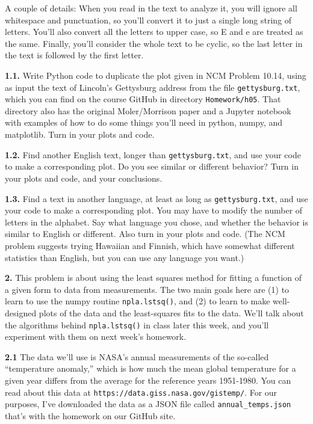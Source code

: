 \documentclass[11pt]{article}
\begin{document}
A couple of details:
When you read in the text to analyze it, you will ignore all whitespace and punctuation,
so you'll convert it to just a single long string of letters.
You'll also convert all the letters to upper case, so E and e are treated as the same.
Finally, you'll consider the whole text to be cyclic, so the last letter in the text is
followed by the first letter.

\par\medskip
{\bf 1.1.}
Write Python code to duplicate the plot given in NCM Problem 10.14, 
using as input the text of Lincoln's Gettysburg address from the file 
{\tt gettysburg.txt}, which you can find on the course GitHub
in directory {\tt Homework/h05}.
That directory also has the original Moler/Morrison paper and
a Jupyter notebook with examples of how to do some things you'll need in 
python, numpy, and matplotlib.
Turn in your plots and code.

\par\medskip
{\bf 1.2.}
Find another English text, longer than {\tt gettysburg.txt},
and use your code to make a corresponding plot.
Do you see similar or different behavior?
Turn in your plots and code, and your conclusions.

\par\medskip
{\bf 1.3.}
Find a text in another language, at least as long as {\tt gettysburg.txt},
and use your code to make a corresponding plot.
You may have to modify the number of letters in the alphabet.
Say what language you chose, and whether the behavior is similar to English or different.
Also turn in your plots and code.
(The NCM problem suggests trying Hawaiian and Finnish, 
which have somewhat different statistics than English,
but you can use any language you want.)

\par\bigskip
{\bf 2.}
This problem is about using the least squares method for fitting a function of a given
form to data from measurements. The two main goals here are (1) to learn to use the
numpy routine {\tt npla.lstsq()}, and (2) to learn to make well-designed plots of the
data and the least-squares fits to the data. We'll talk about the algorithms behind
{\tt npla.lstsq()} in class later this week, and you'll experiment with them on next
week's homework.

\par\medskip
{\bf 2.1}
The data we'll use is NASA's annual measurements of the so-called ``temperature anomaly,''
which is how much the mean global temperature for a given year differs from the average
for the reference years 1951-1980. You can read about this data at 
{\tt https://data.giss.nasa.gov/gistemp/}. For our purposes, I've downloaded the data
as a JSON file called {\tt annual\_temps.json} that's with the homework on our GitHub site.
\end{document}

